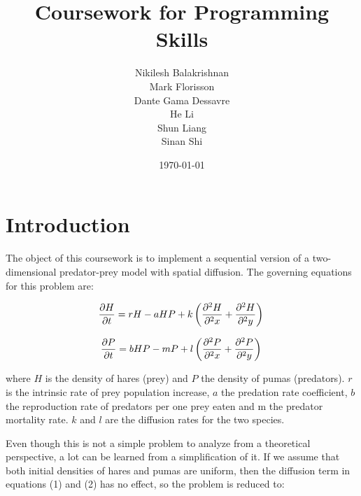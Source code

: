 \documentclass[12pt,a4paper]{article}
\begin{document}
\title{Coursework for Programming Skills}
\author{Nikilesh Balakrishnan\\
        Mark Florisson\\
        Dante Gama Dessavre\\
        He Li\\
        Shun Liang\\
        Sinan Shi}
\date{\today}

\makeEPCCtitle

\thispagestyle{empty}

\newpage


\tableofcontents

\newpage


\section{Introduction}

The object of this coursework is to implement a sequential version of a two-dimensional predator-prey model with spatial diffusion. The governing equations for this problem are:

\begin{equation}
\frac{\partial H}{\partial t}=rH-aHP+k\left(\frac{\partial^2 H}{\partial^2 x}+\frac{\partial^2 H}{\partial^2 y}\right)\\
\end{equation}

\begin{equation}
\frac{\partial P}{\partial t}=bHP-mP+l\left(\frac{\partial^2 P}{\partial^2 x}+\frac{\partial^2 P}{\partial^2 y}\right)\\
\end{equation}

where $H$ is the density of hares (prey) and $P$ the density of pumas (predators). $r$ is the intrinsic rate of prey population increase, $a$ the predation rate coefficient, $b$ the reproduction rate of predators per one prey eaten and m the predator mortality rate. $k$ and $l$ are the diffusion rates for the two species.

Even though this is not a simple problem to analyze from a theoretical perspective, a lot can be learned from a simplification of it. If we assume that both initial densities of hares and pumas are uniform, then the diffusion term in equations (1) and (2) has no effect, so the problem is reduced to:
\end{document}
